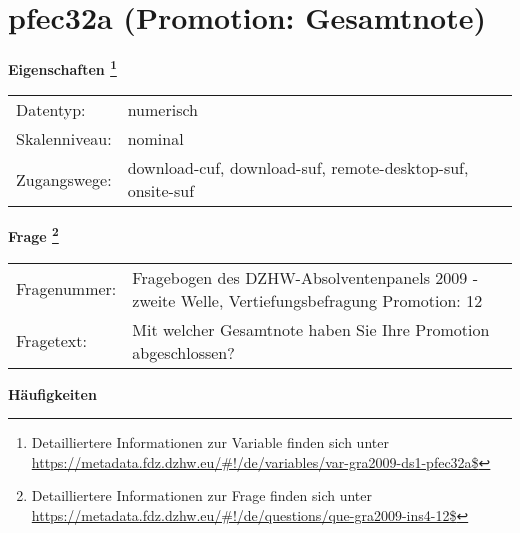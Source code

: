 
    \setcounter{footnote}{0}

    \vspace*{-1.8cm}
	\section{pfec32a (Promotion: Gesamtnote)}
	\label{section:pfec32a}



    \vspace*{0.5cm}
    \noindent\textbf{Eigenschaften
	\footnote{Detailliertere Informationen zur Variable finden sich unter
		\url{https://metadata.fdz.dzhw.eu/\#!/de/variables/var-gra2009-ds1-pfec32a$}}}\\
	\begin{tabularx}{\hsize}{@{}lX}
	Datentyp: & numerisch \\
	Skalenniveau: & nominal \\
	Zugangswege: &
	  download-cuf, 
	  download-suf, 
	  remote-desktop-suf, 
	  onsite-suf
 \\
    \end{tabularx}



				\vspace*{0.5cm}
                \noindent\textbf{Frage
	                \footnote{Detailliertere Informationen zur Frage finden sich unter
		              \url{https://metadata.fdz.dzhw.eu/\#!/de/questions/que-gra2009-ins4-12$}}}\\
				\begin{tabularx}{\hsize}{@{}lX}
					Fragenummer: &
					  Fragebogen des DZHW-Absolventenpanels 2009 - zweite Welle, Vertiefungsbefragung Promotion:
					  12
 \\
					Fragetext: & Mit welcher Gesamtnote haben Sie Ihre Promotion abgeschlossen? \\
				\end{tabularx}





        		\vspace*{0.5cm}
                \noindent\textbf{Häufigkeiten}

